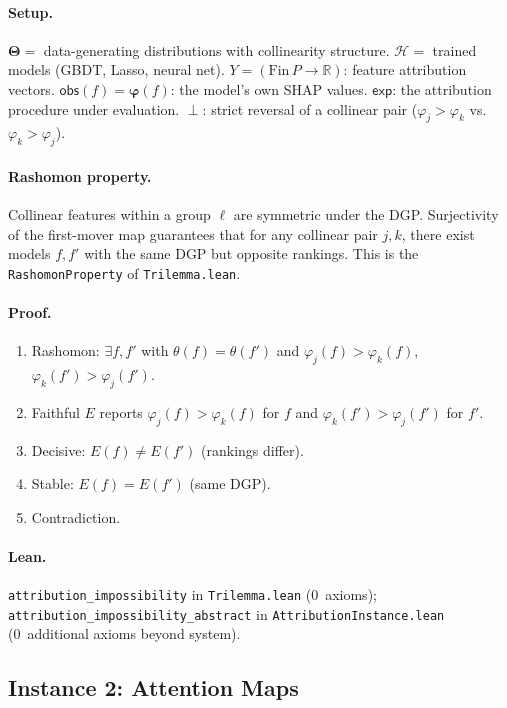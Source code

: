 \documentclass[11pt,a4paper]{article}
\newcommand{\R}{\mathbb{R}}
\newcommand{\Params}{\mathbf{\Theta}}
\newcommand{\sH}{\mathcal{H}}
\newcommand{\incomp}{\perp}
\begin{document}
\paragraph{Setup.}
$\Params ={}$ data-generating distributions with collinearity structure.
$\sH ={}$ trained models (GBDT, Lasso, neural net).
$Y = (\mathrm{Fin}\,P \to \R)$: feature attribution vectors.
$\mathsf{obs}(f) = \boldsymbol{\varphi}(f)$: the model's own SHAP values.
$\mathsf{exp}$: the attribution procedure under evaluation.
$\incomp$: strict reversal of a collinear pair ($\varphi_j > \varphi_k$ vs.\
$\varphi_k > \varphi_j$).

\paragraph{Rashomon property.}
Collinear features within a group $\ell$ are symmetric under the DGP.
Surjectivity of the first-mover map guarantees that for any collinear pair
$j, k$, there exist models $f, f'$ with the same DGP but opposite rankings.
This is the \texttt{RashomonProperty} of \texttt{Trilemma.lean}.

\paragraph{Proof.}
\begin{enumerate}[nosep]
  \item Rashomon: $\exists f, f'$ with $\theta(f) = \theta(f')$ and
    $\varphi_j(f) > \varphi_k(f)$, $\varphi_k(f') > \varphi_j(f')$.
  \item Faithful $E$ reports $\varphi_j(f) > \varphi_k(f)$ for $f$ and
    $\varphi_k(f') > \varphi_j(f')$ for $f'$.
  \item Decisive: $E(f) \neq E(f')$ (rankings differ).
  \item Stable: $E(f) = E(f')$ (same DGP).
  \item Contradiction.
\end{enumerate}

\paragraph{Lean.}
{\raggedright
\texttt{attribution\_impossibility} in \texttt{Trilemma.lean}
(0~axioms);
\texttt{attribution\_impossibility\_abstract} in
\texttt{AttributionInstance.lean}
(0~additional axioms beyond system).\par}

\subsection{Instance 2: Attention Maps}
\label{app:proof-attention}
\end{document}
